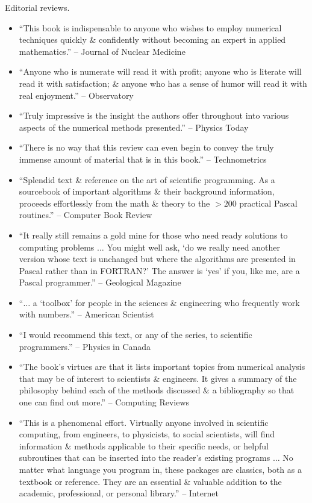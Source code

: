 \documentclass{article}
\begin{document}
\begin{enumerate}
	{\sf Editorial reviews.}
	\begin{itemize}
		\item ``This book is indispensable to anyone who wishes to employ numerical techniques quickly \& confidently without becoming an expert in applied mathematics.'' --  
		Journal of Nuclear Medicine
		\item ``Anyone who is numerate will read it with profit; anyone who is literate will read it with satisfaction; \& anyone who has a sense of humor will read it with real enjoyment.'' -- Observatory
		\item ``Truly impressive is the insight the authors offer throughout into various aspects of the numerical methods presented.'' -- Physics Today
		\item ``There is no way that this review can even begin to convey the truly immense amount of material that is in this book.'' -- Technometrics
		\item ``Splendid text \& reference on the art of scientific programming. As a sourcebook of important algorithms \& their background information, proceeds effortlessly from the math \& theory to the $> 200$ practical Pascal routines.'' -- Computer Book Review
		\item ``It really still remains a gold mine for those who need ready solutions to computing problems $\ldots$ You might well ask, `do we really need another version whose text is unchanged but where the algorithms are presented in Pascal rather than in FORTRAN?' The answer is `yes' if you, like me, are a Pascal programmer.'' -- Geological Magazine
		\item ``$\ldots$ a `toolbox' for people in the sciences \& engineering who frequently work with numbers.'' -- American Scientist
		\item ``I would recommend this text, or any of the series, to scientific programmers.'' -- Physics in Canada
		\item ``The book's virtues are that it lists important topics from numerical analysis that may be of interest to scientists \& engineers. It gives a summary of the philosophy behind each of the methods discussed \& a bibliography so that one can find out more.'' -- Computing Reviews
		\item ``This is a phenomenal effort. Virtually anyone involved in scientific computing, from engineers, to physicists, to social scientists, will find information \& methods applicable to their specific needs, or helpful subroutines that can be inserted into the reader's existing programs $\ldots$ No matter what language you program in, these packages are classics, both as a textbook or reference. They are an essential \& valuable addition to the academic, professional, or personal library.'' -- Internet
	\end{itemize}
	
\end{enumerate}
\end{document}
